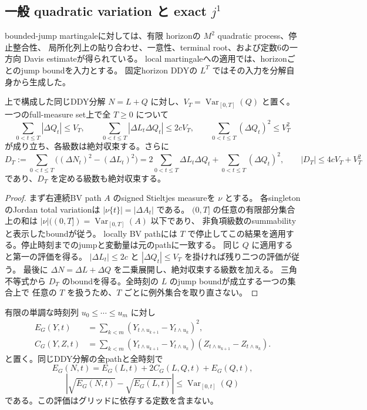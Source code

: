 \subsection{一般 quadratic variation と exact \texorpdfstring{$j^1$}{j1}}

bounded-jump martingaleに対しては、有限 horizonの $M^2$ quadratic process、停止整合性、
局所化列上の貼り合わせ、一意性、terminal root、および定数6の一方向 Davis estimateが得られている。
local martingaleへの適用では、horizonごとのjump boundを入力とする。
固定horizon DDYの $L^T$ ではその入力を分解自身から生成した。

\begin{lemma}[有限変動jump補正の絶対収束]
上で構成した同じDDY分解 $N=L+Q$ に対し、$V_T=\operatorname{Var}_{[0,T]}(Q)$ と置く。
一つのfull-measure set上で全 $T\geq0$ について
\[
 \sum_{0<t\leq T}|\Delta Q_t|\leq V_T,\qquad
 \sum_{0<t\leq T}|\Delta L_t\Delta Q_t|\leq2cV_T,\qquad
 \sum_{0<t\leq T}(\Delta Q_t)^2\leq V_T^2
\]
が成り立ち、各級数は絶対収束する。さらに
\[
 D_T:=\sum_{0<t\leq T}\bigl((\Delta N_t)^2-(\Delta L_t)^2\bigr)
   =2\sum_{0<t\leq T}\Delta L_t\Delta Q_t+
      \sum_{0<t\leq T}(\Delta Q_t)^2,\qquad
 |D_T|\leq4cV_T+V_T^2
\]
であり、$D_T$ を定める級数も絶対収束する。
\end{lemma}

\begin{proof}
まず右連続BV path $A$ のsigned Stieltjes measureを $\nu$ とする。
各singletonのJordan total variationは $|\nu\{t\}|=|\Delta A_t|$ である。
$(0,T]$ の任意の有限部分集合上の和は $|\nu|((0,T])=\operatorname{Var}_{[0,T]}(A)$ 以下であり、
非負項級数のsummabilityと表示したboundが従う。
locally BV pathには $T$ で停止してこの結果を適用する。停止時刻までのjumpと変動量は元のpathに一致する。
同じ $Q$ に適用すると第一の評価を得る。
$|\Delta L_t|\leq2c$ と $|\Delta Q_t|\leq V_T$ を掛ければ残り二つの評価が従う。
最後に $\Delta N=\Delta L+\Delta Q$ を二乗展開し、絶対収束する級数を加える。
三角不等式から $D_T$ のboundを得る。全時刻の $L$ のjump boundが成立する一つの集合上で
任意の $T$ を扱うため、$T$ ごとに例外集合を取り直さない。
\end{proof}

\begin{lemma}[同じ有限グリッド上の二乗和]
有限の単調な時刻列 $u_0\leq\cdots\leq u_m$ に対し
\[
 \begin{aligned}
 E_G(Y,t)&=\sum_{k<m}(Y_{t\wedge u_{k+1}}-Y_{t\wedge u_k})^2,\\
 C_G(Y,Z,t)&=\sum_{k<m}(Y_{t\wedge u_{k+1}}-Y_{t\wedge u_k})
                         (Z_{t\wedge u_{k+1}}-Z_{t\wedge u_k}).
 \end{aligned}
\]
と置く。同じDDY分解の全pathと全時刻で
\[
 E_G(N,t)=E_G(L,t)+2C_G(L,Q,t)+E_G(Q,t),
\]
\[
 \left|\sqrt{E_G(N,t)}-\sqrt{E_G(L,t)}\right|
   \leq\operatorname{Var}_{[0,t]}(Q)
\]
である。この評価はグリッドに依存する定数を含まない。
\end{lemma}


